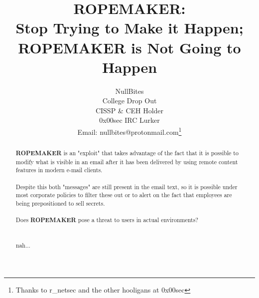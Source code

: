 \documentclass[10pt,a4paper]{article}
\author{\huge{NullBites}\\
		College Drop Out\\
		CISSP \& CEH Holder\\
		0x00sec IRC Lurker\\
		Email: nullbites@protonmail.com\thanks{Thanks to r\_netsec and the other hooligans at 0x00sec}
	}
\title{ROPEMAKER: \\Stop Trying to Make it Happen; \\ROPEMAKER is Not Going to Happen}
\begin{document}
	
	\maketitle
	\begin{abstract}
		{\normalsize \textbf{ROPEMAKER} is an "exploit" that takes advantage of the fact that it is possible to modify what is visible in an email after it has been delivered by using remote content features in modern e-mail clients.\\\\ Despite this both "messages" are still present in the email text, so it is possible under most corporate policies to filter these out or to alert on the fact that employees are being prepositioned to sell secrets. \\\\Does \textbf{ROPEMAKER} pose a threat to users in actual environments?\\
		\\\\nah...}
	\end{abstract}
	\clearpage
	
\end{document}
